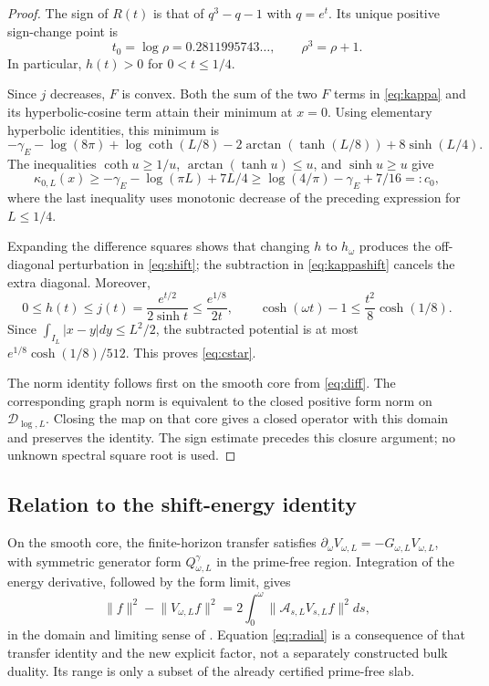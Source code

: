 \documentclass[11pt]{article}
\numberwithin{equation}{section}
\theoremstyle{definition}
\theoremstyle{remark}
\newcommand{\DD}{\mathcal D}
\newcommand{\norm}[1]{\lVert#1\rVert}
\newcommand{\Qgam}{Q^{\gamma}}
\newcommand{\Acal}{\mathcal A}
\begin{document}
\begin{proof}
The sign of $R(t)$ is that of $q^3-q-1$ with $q=e^t$. Its unique positive
sign-change point is
\begin{equation}
t_0=\log\rho=0.2811995743\ldots,\qquad \rho^3=\rho+1.
\label{eq:tzero}
\end{equation}
In particular, $h(t)>0$ for $0<t\leq1/4$.

Since $j$ decreases, $F$ is convex. Both the sum of the two $F$ terms in
\eqref{eq:kappa} and its hyperbolic-cosine term attain their minimum at
$x=0$. Using elementary hyperbolic identities, this minimum is
\begin{equation}
-\gamma_E-\log(8\pi)+\log\coth(L/8)
-2\arctan(\tanh(L/8))+8\sinh(L/4).
\end{equation}
The inequalities $\coth u\geq1/u$, $\arctan(\tanh u)\leq u$, and
$\sinh u\geq u$ give
\begin{equation}
\kappa_{0,L}(x)\geq-\gamma_E-\log(\pi L)+7L/4
\geq\log(4/\pi)-\gamma_E+7/16=:c_0,
\label{eq:kappalower}
\end{equation}
where the last inequality uses monotonic decrease of the preceding
expression for $L\leq1/4$.

Expanding the difference squares shows that changing $h$ to $h_\omega$
produces the off-diagonal perturbation in \eqref{eq:shift}; the subtraction
in \eqref{eq:kappashift} cancels the extra diagonal. Moreover,
\[
0\leq h(t)\leq j(t)=\frac{e^{t/2}}{2\sinh t}\leq\frac{e^{1/8}}{2t},
\qquad
\cosh(\omega t)-1\leq\frac{t^2}{8}\cosh(1/8).
\]
Since $\int_{I_L}|x-y|dy\leq L^2/2$, the subtracted potential is at most
$e^{1/8}\cosh(1/8)/512$. This proves \eqref{eq:cstar}.

The norm identity follows first on the smooth core from \eqref{eq:diff}.
The corresponding graph norm is equivalent to the closed positive form
norm on $\DD_{\log,L}$. Closing the map on that core gives a closed
operator with this domain and preserves the identity. The sign estimate
precedes this closure argument; no unknown spectral square root is used.
\end{proof}

\subsection{Relation to the shift-energy identity}

On the smooth core, the finite-horizon transfer satisfies
$\partial_\omega V_{\omega,L}=-G_{\omega,L}V_{\omega,L}$, with symmetric
generator form $\Qgam_{\omega,L}$ in the prime-free region. Integration of
the energy derivative, followed by the form limit, gives
\begin{equation}
\norm f^2-\norm{V_{\omega,L}f}^2
=2\int_0^\omega
\norm{\Acal_{s,L}V_{s,L}f}^2ds,
\label{eq:radial}
\end{equation}
in the domain and limiting sense of \cite{BakerFirst}. Equation
\eqref{eq:radial} is a consequence of that transfer identity and the new
explicit factor, not a separately constructed bulk duality. Its range is
only a subset of the already certified prime-free slab.
\end{document}
